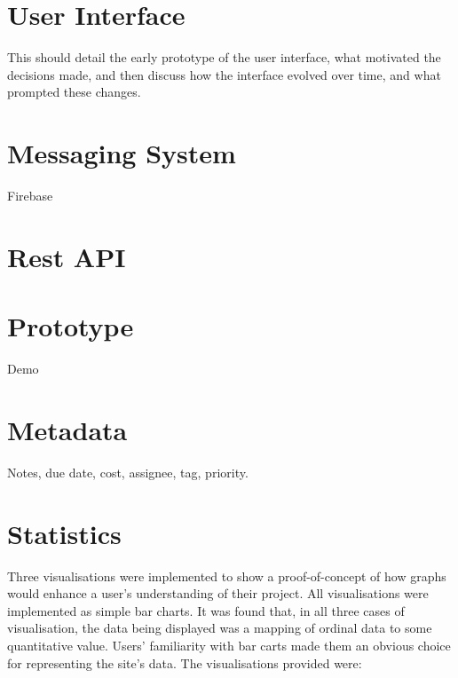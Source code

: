 \documentclass[a4paper]{l3proj}
\begin{document}
\section{User Interface}

This should detail the early prototype of the user interface, what motivated the decisions made, 
and then discuss how the interface evolved over time, and what prompted these changes.

\section{Messaging System}

Firebase

\section{Rest API}


\section{Prototype}

Demo

\section{Metadata}

Notes, due date, cost, assignee, tag, priority.

\section{Statistics}

Three visualisations were implemented to show a proof-of-concept of how graphs would enhance a user’s understanding of their project. 
All visualisations were implemented as simple bar charts. It was found that, in all three cases of visualisation, the data being displayed was a mapping of ordinal data to some quantitative value. Users’ familiarity with bar carts made them an obvious choice for representing the site’s data. 
The visualisations provided were:
\end{document}
